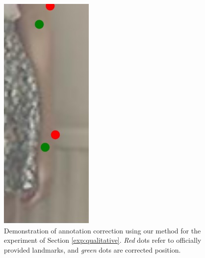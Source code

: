 \begin{figure}[!t]
    \hfill
    \includegraphics[height=\fh]{resources/Annotation_Correction/Fixing/fix_18}
    \caption{Demonstration of annotation correction using our method for the experiment of Section \ref{exp:qualitative}. \emph{Red} dots refer to officially provided landmarks, and \emph{green} dots are corrected position.}
    \label{fig:qualitative}
\end{figure}

